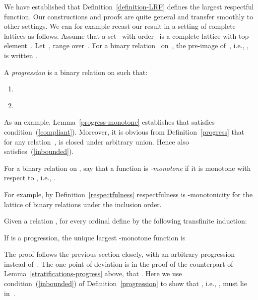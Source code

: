 \documentclass{CSML}
\theoremstyle{definition}
\begin{document}
We have established that Definition~\ref{definition-LRF} defines the
largest respectful function.
Our constructions and proofs are quite general and transfer smoothly
to other settings.  We can for example recast our result in a setting
of complete lattices as follows.  Assume that a set~ with
order~ is a complete lattice with top element~.  Let~,
 range over~.  For a binary relation~ on~, the pre-image
of~, i.e., , is written .

\begin{defi}
\label{progression}
A {\em progression} is a binary relation  on  such that:
\begin{enumerate}
\item
\label{compliant}

\item
\label{inbounded}

\end{enumerate}
\end{defi}

As an example, Lemma~\ref{progress-monotone} establishes that
 satisfies condition~(\ref{compliant}).  Moreover, it is
obvious from Definition~\ref{progress} that for any relation~,
 is closed under arbitrary union.  Hence
 also satisfies~(\ref{inbounded}).

\begin{defi}
\label{Rmonotone}
For a binary relation  on , say that a function  is {\em -monotone} if it is monotone with respect to
, i.e., .
\end{defi}

For example, by Definition~\ref{respectfulness} respectfulness is
-monotonicity for the lattice of binary relations under the
inclusion order.

\begin{defi}
\label{general-stratification}
Given a relation , for every ordinal  define  by the following transfinite induction:

\end{defi}

\begin{thm}
\label{general-theorem}
If  is a progression, the unique largest -monotone function is

\end{thm}

The proof follows the previous section closely, with an arbitrary
progression instead of~. The one point of deviation is in
the proof of the counterpart of Lemma~\ref{stratifications-progress}
above, that . Here we use
condition~(\ref{inbounded}) of Definition~\ref{progression} to show
that , i.e., , must lie in~.
\end{document}
